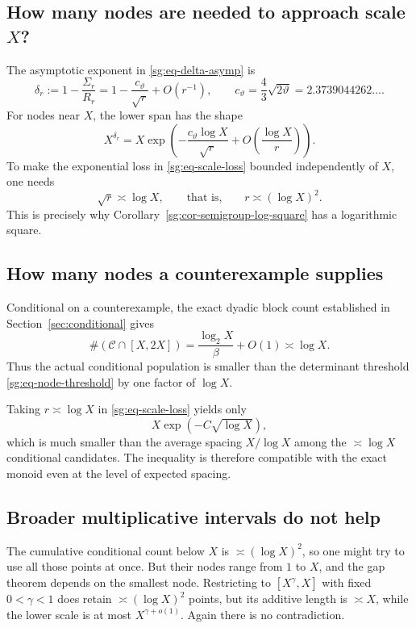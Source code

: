 \documentclass[11pt,oneside]{article}
\theoremstyle{definition}
\theoremstyle{remark}
\newcommand{\thetaq}{\vartheta}
\newcommand{\Cand}{\mathcal C}
\begin{document}
\subsection{How many nodes are needed to approach scale \texorpdfstring{$X$}{X}?}

The asymptotic exponent in \eqref{sg:eq-delta-asymp} is
\[
 \delta_r:=1-\frac{\Sigma_r}{R_r}
 =1-\frac{c_{\thetaq}}{\sqrt r}+O(r^{-1}),
 \qquad
 c_{\thetaq}=\frac43\sqrt{2\thetaq}=2.3739044262\ldots.
\]
For nodes near $X$, the lower span has the shape
\begin{equation}
 X^{\delta_r}
 =X\exp\!\left(-\frac{c_{\thetaq}\log X}{\sqrt r}+O\!\left(\frac{\log X}{r}\right)\right).
 \label{sg:eq-scale-loss}
\end{equation}
To make the exponential loss in \eqref{sg:eq-scale-loss} bounded independently of $X$, one
needs
\begin{equation}
 \sqrt r\asymp\log X,
 \qquad\text{that is,}\qquad
 r\asymp(\log X)^2.
 \label{sg:eq-node-threshold}
\end{equation}
This is precisely why Corollary~\ref{sg:cor-semigroup-log-square} has a logarithmic square.

\subsection{How many nodes a counterexample supplies}

Conditional on a counterexample, the exact dyadic block count established in
Section~\ref{sec:conditional} gives
\begin{equation}
 \#(\Cand\cap[X,2X])
 =\frac{\log_2X}{\beta}+O(1)
 \asymp\log X.
 \label{sg:eq-conditional-log-population}
\end{equation}
Thus the actual conditional population is smaller than the determinant threshold
\eqref{sg:eq-node-threshold} by one factor of $\log X$.

Taking $r\asymp\log X$ in \eqref{sg:eq-scale-loss} yields only
\[
 X\exp(-C\sqrt{\log X}),
\]
which is much smaller than the average spacing $X/\log X$ among the
$\asymp\log X$ conditional candidates.  The inequality is therefore compatible with the
exact monoid even at the level of expected spacing.

\subsection{Broader multiplicative intervals do not help}

The cumulative conditional count below $X$ is $\asymp(\log X)^2$, so one might try to use all
those points at once.  But their nodes range from $1$ to $X$, and the gap theorem depends on
the smallest node.  Restricting to $[X^\gamma,X]$ with fixed $0<\gamma<1$ does retain
$\asymp(\log X)^2$ points, but its additive length is $\asymp X$, while the lower scale is at
most $X^{\gamma+o(1)}$.  Again there is no contradiction.
\end{document}
